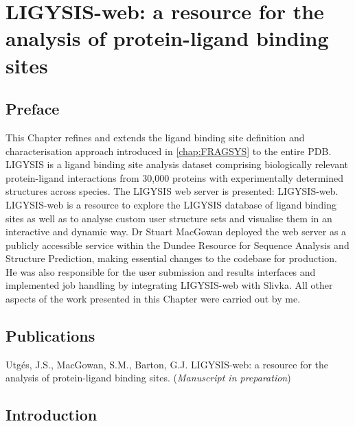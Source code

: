 \chapter{LIGYSIS-web: a resource for the analysis of protein-ligand binding sites}
\label{chap:LIGYSIS_WEB}

\section*{Preface}

This Chapter refines and extends the ligand binding site definition and characterisation approach introduced in \autoref{chap:FRAGSYS} to the entire PDB. LIGYSIS is a ligand binding site analysis dataset comprising biologically relevant protein-ligand interactions from 30,000 proteins with experimentally determined structures across species. The LIGYSIS web server is presented: LIGYSIS-web. LIGYSIS-web is a resource to explore the LIGYSIS database of ligand binding sites as well as to analyse custom user structure sets and visualise them in an interactive and dynamic way. Dr Stuart MacGowan deployed the web server as a publicly accessible service within the Dundee Resource for Sequence Analysis and Structure Prediction, making essential changes to the codebase for production. He was also responsible for the user submission and results interfaces and implemented job handling by integrating LIGYSIS-web with Slivka. All other aspects of the work presented in this Chapter were carried out by me.

\section*{Publications}

Utgés, J.S., MacGowan, S.M., Barton, G.J. LIGYSIS-web: a resource for the analysis of protein-ligand binding sites. (\textit{Manuscript in preparation})



\section{Introduction}

